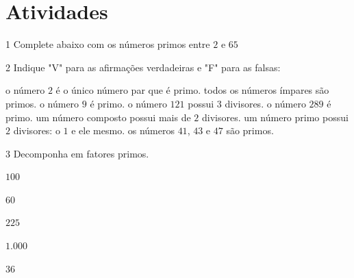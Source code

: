 
\section{Atividades}

\num{1}  Complete abaixo com os números primos entre $2$ e $65$



\num{2}  Indique "V" para as afirmações verdadeiras e "F" para as falsas:

\begin{boxlist}
\boxitem[\rosa{V}] o número $2$ é o único número par que é primo.
\boxitem[\rosa{F}] todos os números ímpares são primos.
\boxitem[\rosa{F}] o número $9$ é primo.
\boxitem[\rosa{V}] o número $121$ possui $3$ divisores.
\boxitem[\rosa{F}] o número $289$ é primo.
\boxitem[\rosa{V}] um número composto possui mais de $2$ divisores.
\boxitem[\rosa{V}] um número primo possui $2$ divisores: o $1$ e ele mesmo.
\boxitem[\rosa{V}] os números $41$, $43$ e $47$ são primos.
\end{boxlist}

\num{3} Decomponha em fatores primos.

\begin{escolha}
\item  $100$    
\item  $60$     
\item  $225$    
\item  $1.000$  
\item  $36$     
\end{escolha}

